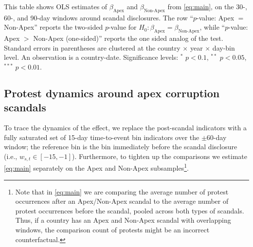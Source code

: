 \documentclass[11pt]{article}
\let\mathbetasym\beta
\renewcommand{\beta}{\ensuremath{\mathbetasym}}
\begin{document}
\begin{table}[htb!]
    \caption{Apex scandals cause violent mobilization while Non-Apex scandals do not}
    \label{tab:main}
    \begin{center}
        \scriptsize{}
    \end{center}
    \footnotesize{This table shows OLS estimates of $\beta_{\text{Apex}}$ and $\beta_{\text{Non-Apex}}$ from \autoref{eq:main}, on the 30-, 60-, and 90-day windows around scandal disclosures. The row ``$p$-value: Apex $=$ Non-Apex'' reports the two-sided $p$-value for $H_0:\beta_{\text{Apex}}=\beta_{\text{Non-Apex}}$, while ``$p$-value: Apex $>$ Non-Apex (one-sided)'' reports the one sided analog of the test. Standard errors in parentheses are clustered at the country $\times$ year $\times$ day-bin level. An observation is a country-date. Significance levels: $^{*}$ $p<0.1$, $^{**}$ $p<0.05$, $^{***}$ $p<0.01$.}
\end{table}

\subsection{Protest dynamics around apex corruption scandals}

To trace the dynamics of the effect, we replace the post-scandal indicators with a fully saturated set of 15-day time-to-event bin indicators over the $\pm 60$-day window; the reference bin is the bin immediately before the scandal disclosure (i.e., $w_{s,t} \in [-15, -1]$). Furthermore, to tighten up the comparisons we estimate \autoref{eq:main} separately on the Apex and Non-Apex subsamples\footnote{Note that in \autoref{eq:main} we are comparing the average number of protest occurrences after an Apex/Non-Apex scandal to the average number of protest occurrences before the scandal, pooled across both types of scandals. Thus, if a country has an Apex and Non-Apex scandal with overlapping windows, the comparison count of protests might be an incorrect counterfactual.}.
\end{document}
